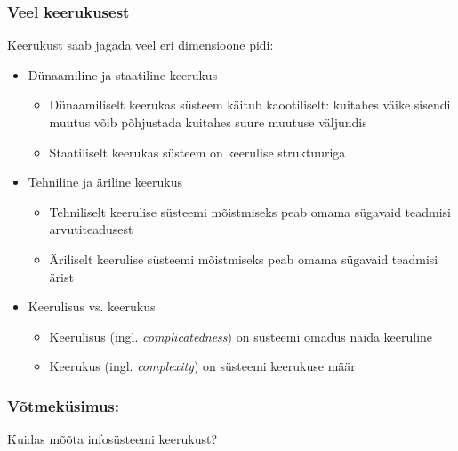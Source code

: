 \begin{frame}[fragile]
  \frametitle{Veel keerukusest}
	Keerukust saab jagada veel eri dimensioone pidi:
	
	\begin{itemize}
		\item Dünaamiline ja staatiline keerukus
			\begin{itemize}
				\item Dünaamiliselt keerukas süsteem käitub kaootiliselt: kuitahes väike sisendi muutus võib põhjustada kuitahes suure muutuse väljundis
				\item Staatiliselt keerukas süsteem on keerulise struktuuriga
			\end{itemize} 
		\item Tehniline ja äriline keerukus
			\begin{itemize}
				\item Tehniliselt keerulise süsteemi mõistmiseks peab omama sügavaid teadmisi arvutiteadusest  
				\item Äriliselt keerulise süsteemi mõistmiseks peab omama sügavaid teadmisi ärist
			\end{itemize} 
		\item Keerulisus vs. keerukus
			\begin{itemize}
				\item Keerulisus (ingl. \emph{complicatedness}) on süsteemi omadus näida keeruline
				\item Keerukus (ingl. \emph{complexity}) on süsteemi keerukuse määr
			\end{itemize} 
	\end{itemize}
\end{frame}

\begin{frame}[fragile]
	\frametitle{Võtmeküsimus:}
	\vfill
	\begin{center}
		Kuidas mõõta infosüsteemi keerukust?  
	\end{center}
	\vfill
\end{frame}



